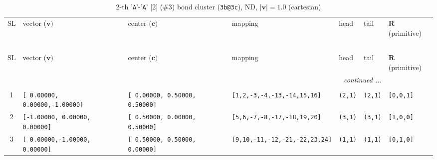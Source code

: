 \documentclass[fleqn,10pt,landscape]{jsarticle}
\begin{document}
\begin{longtable}[l]{cllllll}
\captionsetup{justification=raggedright, singlelinecheck=off}
\caption{2-th '\texttt{A}'-'\texttt{A}' [2] (\#3) bond cluster (\texttt{3b@3c}), ND, $|\bm{v}|=1.0$ (cartesian)}
 \\
 \hline \hline
SL & vector ($\bm{v})$ & center ($\bm{c})$ & mapping & head & tail & $\bm{R}$ (primitive) \\ \hline \endfirsthead

\multicolumn{6}{l}{\tablename\ \thetable{}} \\
 \hline \hline
SL & vector ($\bm{v})$ & center ($\bm{c})$ & mapping & head & tail & $\bm{R}$ (primitive) \\ \hline \endhead

 \hline \hline
\multicolumn{6}{r}{\footnotesize\it continued ...} \\ \endfoot

 \hline \hline
\multicolumn{6}{r}{} \\ \endlastfoot

1 & \texttt{[ 0.00000, 0.00000,-1.00000]} & \texttt{[ 0.00000, 0.50000, 0.50000]} & \texttt{[1,2,-3,-4,-13,-14,15,16]} & \texttt{(2,1)} & \texttt{(2,1)} & \texttt{[0,0,1]} \\ \hline
2 & \texttt{[-1.00000, 0.00000, 0.00000]} & \texttt{[ 0.50000, 0.00000, 0.50000]} & \texttt{[5,6,-7,-8,-17,-18,19,20]} & \texttt{(3,1)} & \texttt{(3,1)} & \texttt{[1,0,0]} \\ \hline
3 & \texttt{[ 0.00000,-1.00000, 0.00000]} & \texttt{[ 0.50000, 0.50000, 0.00000]} & \texttt{[9,10,-11,-12,-21,-22,23,24]} & \texttt{(1,1)} & \texttt{(1,1)} & \texttt{[0,1,0]} \\
\end{longtable}
\renewcommand{\arraystretch}{1.6}
\end{document}
